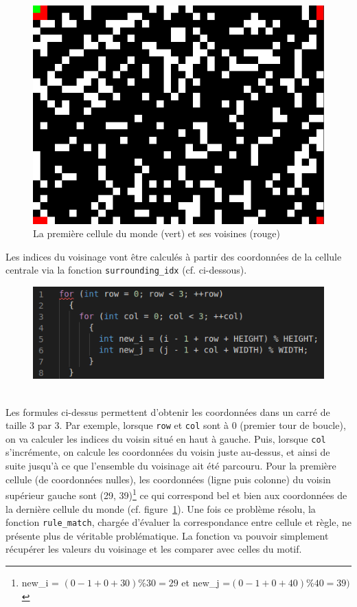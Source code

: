 \documentclass[a4paper]{article}
\begin{document}
\begin{figure}[htb]
    \centering
    \includegraphics[scale=0.3]{img/torique.png}
    \caption{La première cellule du monde (vert) et ses voisines (rouge)}
    \label{fig:torique}
\end{figure}
\newpage
Les indices du voisinage vont être calculés à partir des coordonnées de la cellule centrale via la fonction \texttt{surrounding\_idx} (cf. ci-dessous).
\begin{figure}[htb]
    \centering
    \includegraphics[scale=0.8]{img/indice.png}
\end{figure}
\\\indent Les formules ci-dessus permettent d'obtenir les coordonnées dans un carré de taille 3 par 3. Par exemple, lorsque \texttt{row} et \texttt{col} sont à 0 (premier tour de boucle), on va calculer les indices du voisin situé en haut à gauche. Puis, lorsque \texttt{col} s'incrémente, on calcule les coordonnées du voisin juste au-dessus, et ainsi de suite jusqu'à ce que l'ensemble du voisinage ait été parcouru. Pour la première cellule (de coordonnées nulles), les coordonnées (ligne puis colonne) du voisin supérieur gauche sont {\small (29, 39)\footnote{new\_i = \((0-1+0+30)\%30 = 29\) et new\_j =\((0-1+0+40)\%40 = 39)\)}} ce qui correspond bel et bien aux coordonnées de la dernière cellule du monde (cf. figure~\ref{fig:torique}). Une fois ce problème résolu, la fonction \texttt{rule\_match}, chargée d'évaluer la correspondance entre cellule et règle, ne présente plus de véritable problématique. La fonction va pouvoir simplement récupérer les valeurs du voisinage et les comparer avec celles du motif.
\end{document}
